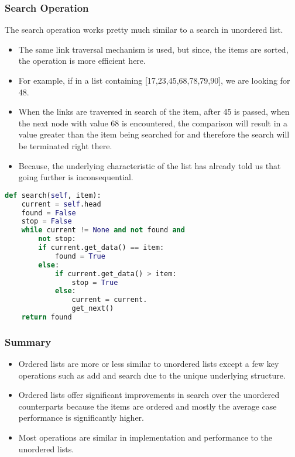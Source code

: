 \documentclass{beamer}
\begin{document}
\begin{frame}
\frametitle{Search Operation}

The search operation works pretty much similar to a search in unordered list.

\begin{itemize}
\item The same link traversal mechanism is used, but since, the items are sorted, the  operation is more efficient here.

\item For example, if in a list containing [17,23,45,68,78,79,90], we are looking for 48.

\item When the links are traversed in search of the item, after 45 is passed, when the next node with value 68 is encountered, the comparison will result in a value greater than the item being searched for and therefore the search will be terminated right there.

\item Because, the underlying characteristic of the list has already told us that going further is inconsequential. 
\end{itemize}
\end{frame}

\begin{frame}[fragile]
\begin{lstlisting}[language=Python]
def search(self, item):
	current = self.head
	found = False
	stop = False
	while current != None and not found and
	 	not stop:
		if current.get_data() == item:
			found = True
		else:
			if current.get_data() > item:
				stop = True
			else:
				current = current.
				get_next()
	return found
\end{lstlisting}
\end{frame}


\begin{frame}
\frametitle{Summary}
\begin{itemize}
\item Ordered lists are more or less similar to unordered lists except a few key operations such as  add and search due to the unique underlying structure.
\item Ordered lists offer significant improvements in search over the unordered counterparts because the items are ordered and mostly the average case performance is significantly higher.
\item Most operations are similar  in implementation and performance to the unordered lists.
\end{itemize}
\end{frame}
\end{document}
